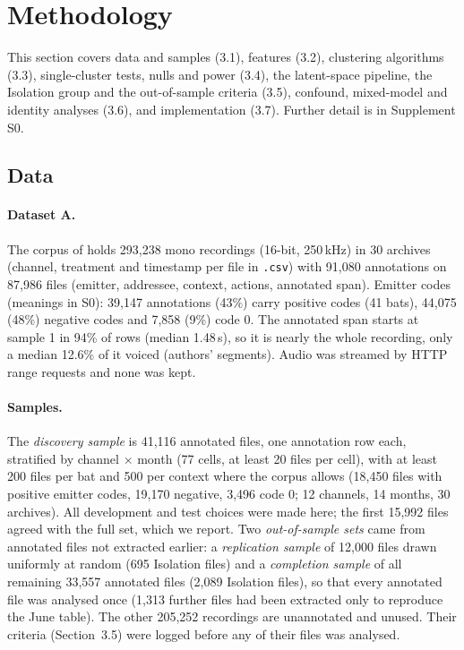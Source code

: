 \section{Methodology}
This section covers data and samples (3.1), features (3.2), clustering algorithms (3.3), single-cluster tests, nulls and power (3.4), the latent-space pipeline, the Isolation group and the out-of-sample criteria (3.5), confound, mixed-model and identity analyses (3.6), and implementation (3.7). Further detail is in Supplement S0.

\subsection{Data}
\paragraph{Dataset A.} The corpus of \citet{prat2017} holds 293,238 mono recordings (16-bit, 250\,kHz) in 30 archives (channel, treatment and timestamp per file in \sd{}\texttt{.csv}) with 91,080 annotations on 87,986 files (emitter, addressee, context, actions, annotated span). Emitter codes (meanings in S0): 39,147 annotations (43\%) carry positive codes (41 bats), 44,075 (48\%) negative codes and 7,858 (9\%) code 0. The annotated span starts at sample 1 in 94\% of rows (median 1.48\,s), so it is nearly the whole recording, only a median 12.6\% of it voiced (authors' segments). Audio was streamed by HTTP range requests and none was kept.

\paragraph{Samples.} The \emph{discovery sample} is 41,116 annotated files, one annotation row each, stratified by channel $\times$ month (77 cells, at least 20 files per cell), with at least 200 files per bat and 500 per context where the corpus allows (18,450 files with positive emitter codes, 19,170 negative, 3,496 code 0; 12 channels, 14 months, 30 archives). All development and test choices were made here; the first 15,992 files agreed with the full set, which we report. Two \emph{out-of-sample sets} came from annotated files not extracted earlier: a \emph{replication sample} of 12,000 files drawn uniformly at random (695 Isolation files) and a \emph{completion sample} of all remaining 33,557 annotated files (2,089 Isolation files), so that every annotated file was analysed once (1,313 further files had been extracted only to reproduce the June table). The other 205,252 recordings are unannotated and unused. Their criteria (Section~3.5) were logged before any of their files was analysed.

